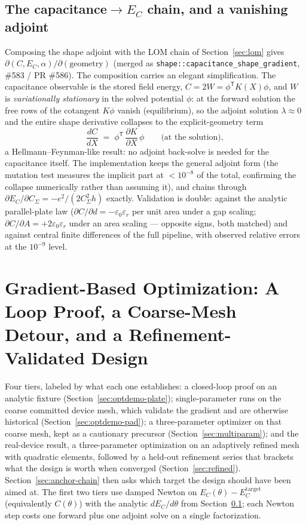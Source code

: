 \documentclass{anvil-paper}
\begin{document}
\subsection{The \texorpdfstring{capacitance$\to E_C$}{capacitance-to-E\_C} chain, and a vanishing adjoint}
\label{sec:chain}

Composing the shape adjoint with the LOM chain of Section~\ref{sec:lom}
gives $\partial(C, E_C, \alpha)/\partial(\text{geometry})$ (merged as
\texttt{shape::capacitance\_shape\_gradient}, \#583 / PR \#586). The
composition carries an elegant simplification. The capacitance observable
is the stored field energy, $C = 2W = \phi^{\mathsf{T}}K(X)\phi$, and $W$
is \emph{variationally stationary} in the solved potential $\phi$: at the
forward solution the free rows of the cotangent $K\phi$ vanish
(equilibrium), so the adjoint solution $\lambda \approx 0$ and the entire
shape derivative collapses to the explicit-geometry term
\begin{equation}
  \frac{dC}{dX}
  \;=\; \phi^{\mathsf{T}}\,\frac{\partial K}{\partial X}\,\phi
  \qquad\text{(at the solution)},
  \label{eq:hf}
\end{equation}
a Hellmann--Feynman-like result: no adjoint back-solve is needed for the
capacitance itself. The implementation keeps the general adjoint form
(the mutation test measures the implicit part at $<10^{-8}$ of the
total, confirming the collapse numerically rather than assuming it), and
chains through $\partial E_C/\partial C_\Sigma = -e^2/(2C_\Sigma^2 h)$
exactly. Validation is double: against the analytic parallel-plate law
($\partial C/\partial d = -\varepsilon_0\varepsilon_r$ per unit area
under a gap scaling; $\partial C/\partial A = +2\varepsilon_0
\varepsilon_r$ under an area scaling --- opposite signs, both matched)
and against central finite differences of the full pipeline, with
observed relative errors at the $10^{-9}$ level.

\section{Gradient-Based Optimization: A Loop Proof, a Coarse-Mesh
Detour, and a Refinement-Validated Design}
\label{sec:optdemo}

Four tiers, labeled by what each one establishes: a closed-loop proof
on an analytic fixture (Section~\ref{sec:optdemo-plate});
single-parameter runs on the coarse committed device mesh, which
validate the gradient and are otherwise historical
(Section~\ref{sec:optdemo-pad}); a three-parameter optimizer on that
coarse mesh, kept as a cautionary precursor
(Section~\ref{sec:multiparam}); and the real-device result, a
three-parameter optimization on an adaptively refined mesh with
quadratic elements, followed by a held-out refinement series that
brackets what the design is worth when converged
(Section~\ref{sec:refined}). Section~\ref{sec:anchor-chain} then asks
which target the design should have been aimed at. The first two tiers use damped Newton on
$E_C(\theta) - E_C^{\mathrm{target}}$ (equivalently
$C(\theta)$) with the analytic $dE_C/d\theta$ from
Section~\ref{sec:chain}; each Newton step costs one forward plus one
adjoint solve on a single factorization.
\end{document}

